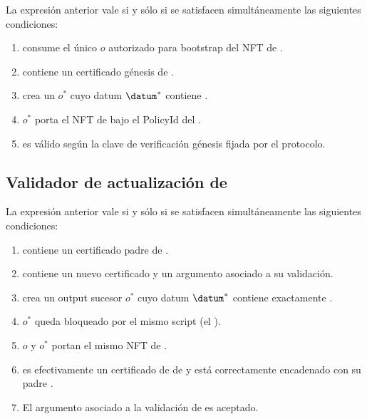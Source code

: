 \begin{center}
\MintValidatorNotation{\StakeDistributionMintValidator}
\end{center}

La expresión anterior vale si y sólo si se satisfacen simultáneamente las siguientes condiciones:

\begin{enumerate}[noitemsep]
  \item \tx consume el único \UTxO $o$ autorizado para bootstrap del NFT de \StakeDistribution.
  \item \redeemer contiene un certificado génesis \GenesisCertificate de \Mithril.
  \item \tx crea un \UTxO $o^*$ cuyo datum $\datum^*$ contiene \GenesisCertificate.
  \item $o^*$ porta el NFT de \StakeDistribution bajo el \textsf{PolicyId} del \MintingValidator.
  \item \GenesisCertificate es válido según la clave de verificación génesis \GenesisVerificationKey fijada por el protocolo.
\end{enumerate}

\subsection{Validador de actualización de \StakeDistribution}

\begin{center}
\SpendValidatorNotation{\StakeDistributionSpendValidator}
\end{center}

La expresión anterior vale si y sólo si se satisfacen simultáneamente las siguientes condiciones:

\begin{enumerate}[noitemsep]
  \item \datum contiene un certificado padre \StakeDistributionCertificate de \Mithril.
  \item \redeemer contiene un nuevo certificado \StakeDistributionCertificateNew y un argumento \ZK asociado a su validación.
  \item \tx crea un output sucesor $o^*$ cuyo datum  $\datum^*$ contiene exactamente \StakeDistributionCertificateNew.
  \item $o^*$ queda bloqueado por el mismo script (el \StakeDistributionSpendValidator).
  \item $o$ y $o^*$ portan el mismo NFT de \StakeDistribution.
  \item \StakeDistributionCertificateNew es efectivamente un certificado de \StakeDistribution de \Mithril y está correctamente encadenado con su padre \StakeDistributionCertificate.
  \item El argumento \ZK asociado a la validación de \StakeDistributionCertificateNew es aceptado.
\end{enumerate}

